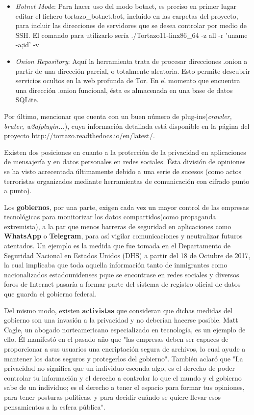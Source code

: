 \begin{itemize}
	\item{\textit{Botnet Mode}}: Para hacer uso del modo botnet, es preciso en primer lugar editar el fichero tortazo\_botnet.bot, incluido en las carpetas del proyecto, para incluir las direcciones de servidores que se desea controlar por medio de SSH. El comando para utilizarlo sería 
		{\selectfont 
			./Tortazo11-linx86\_64 -z all -r 'uname -a;id' -v
		}
	\item{\textit{Onion Repository}}: Aquí la herramienta trata de procesar direcciones .onion a partir de una dirección parcial, o totalmente aleatoria. Esto permite descubrir servicios ocultos en la web profunda de Tor. 
	En el momento que encuentra una dirección .onion funcional, ésta es almacenada en una base de datos SQLite.
\end{itemize}
	Por último, mencionar que cuenta con un buen número de plug-ins(\textit{crawler, bruter, w3afplugin...}), cuya información detallada está disponible en la página del proyecto http://tortazo.readthedocs.io/en/latest/. 
	
\label{sec:social}

Existen dos posiciones en cuanto a la protección de la privacidad en
aplicaciones de mensajería y en datos personales en redes
sociales. Ésta división de opiniones se ha visto acrecentada
últimamente debido a una serie de sucesos (como actos terroristas
organizados mediante herramientas de comunicación con cifrado punto a
punto).

Los \textbf{gobiernos}, por una parte, exigen cada vez un mayor
control de las empresas tecnológicas para monitorizar los datos
compartidos(como propaganda extremista), a la par que menos barreras
de seguridad en aplicaciones como \textbf{WhatsApp} o
\textbf{Telegram}, para así vigilar comunicaciones y neutralizar
futuros atentados.  Un ejemplo es la medida que fue tomada en el
Departamento de Seguridad Nacional en Estados Unidos (DHS) a partir del
18 de Octubre de 2017, la cual implicaba que toda aquella información
tanto de inmigrantes como nacionalizados estadounidenses pque se
encontrase en redes sociales y diversos foros de Internet pasaría a
formar parte del sistema de registro oficial de datos que guarda el
gobierno federal. 

Del mismo modo, existen \textbf{activistas} que consideran que dichas
medidas del gobierno son una invasión a la privacidad y no deberían
hacerse posible. Matt Cagle, un abogado norteamericano especializado
en tecnología, es un ejemplo de ello. Él manifestó en el pasado año
que "las empresas deben ser capaces de proporcionar a sus usuarios una
encriptación segura de archivos, lo cual ayude a mantener los datos
seguros y protegerlos del gobierno". También aclaró que "La privacidad
no significa que un individuo esconda algo, es el derecho de poder
controlar tu información y el derecho a controlar lo que el mundo y el
gobierno sabe de un individuo; es el derecho a tener el espacio para
formar tus opiniones, para tener posturas políticas, y para decidir
cuándo se quiere llevar esos pensamientos a la esfera pública".

